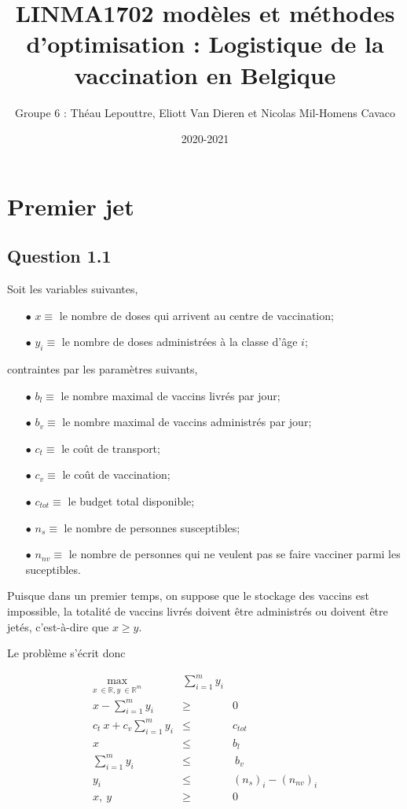 \documentclass[a4paper,11pt]{report}
\title{LINMA1702 modèles et méthodes d'optimisation : 
Logistique de la vaccination en Belgique
}
\author{Groupe 6 : Théau Lepouttre, Eliott Van Dieren et Nicolas Mil-Homens Cavaco}
\date{2020-2021}
\begin{document}
\maketitle
\section{Premier jet}

\subsection{Question 1.1}

Soit les variables suivantes,
\begin{itemize}
\item[$\bullet$]  $x \equiv$ le nombre de doses qui arrivent au centre de vaccination; 
\item[$\bullet$]  $y_i \equiv$ le nombre de doses administrées à la classe d'âge $i$;
\end{itemize}


contraintes par les paramètres suivants,
\begin{itemize}
\item[$\bullet$]  $b_l \equiv$ le nombre maximal de vaccins livrés par jour;
\item[$\bullet$]  $b_v \equiv$ le nombre maximal de vaccins administrés par jour;
\item[$\bullet$]  $c_t \equiv$ le coût de transport;
\item[$\bullet$]  $c_v \equiv$ le coût de vaccination;
\item[$\bullet$]  $c_{tot} \equiv$ le budget total disponible;
\item[$\bullet$]  $n_s \equiv$ le nombre de personnes susceptibles;
\item[$\bullet$]  $n_{nv} \equiv$ le nombre de personnes qui ne veulent pas se faire vacciner parmi les suceptibles. 
\end{itemize}
Puisque dans un premier temps, on suppose que le stockage des vaccins est impossible, la totalité de vaccins livrés doivent être administrés ou doivent être jetés, c'est-à-dire que $x \geq y$.

Le problème s'écrit donc

\begin{eqnarray*}
\max_{x\ \in \mathbb{R}, y\ \in \mathbb{R}^m}& \sum_{i=1}^{m} y_i & \\
x - \sum_{i=1}^{m} y_i &\geq& 0 \\
c_t\ x + c_v \sum_{i=1}^{m} y_i &\leq& c_{tot} \\
x &\leq& b_l \\
\sum_{i=1}^{m} y_i &\leq&\ b_v \\
y_i &\leq& (n_s)_i - (n_{nv})_i \\
x,\ y &\geq& 0
\end{eqnarray*}
\end{document}
